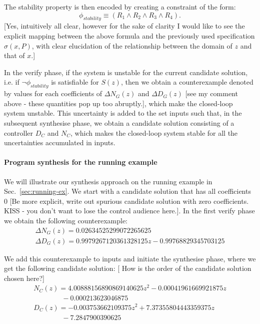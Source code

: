 \documentclass{sig-alternate-05-2015}
\newcommand{\red}[1]{{\color{red}#1}}
\begin{document}
The stability property is then encoded by creating a
constraint of the form:
$$
\phi_{stability} \equiv (R_1 \wedge R_2 \wedge R_3 \wedge R_4).
$$
\red{[Yes, intuitively all clear, however for the sake of clarity I would like to see the explicit mapping between the above formula and the previously used specification 
$\sigma(x, P)$, with clear elucidation of the relationship between the domain of $z$ and that of $x$.]}

In the {\sc verify} phase, if the system is unstable for the current candidate solution,
i.e. if $\neg \phi_{stability}$ is satisfiable for $S(z)$, 
then we obtain a counterexample denoted by 
values for each coefficients of $\Delta N_{G}(z)$ and $\Delta D_{G}(z)$ \red{[see my comment above - these quantities pop up too abruptly.]},
which make the closed-loop system unstable. This uncertainty is added to 
the set {\sc inputs} such that, in the subsequent {\sc synthesise} phase, 
we obtain a candidate solution consisting 
of a controller $D_C$ and $N_C$, which makes the closed-loop 
system stable for all the uncertainties accumulated in {\sc inputs}.

\paragraph{Program synthesis for the running example}
We will illustrate our synthesis approach on the running example 
in Sec.~\ref{sec:running-ex}.
We start with a candidate solution that has all coefficients 0 \red{[Be more explicit, write out spurious candidate solution with zero coefficients. KISS - you don't want to lose the control audience here.]}.
In the first {\sc verify} phase we obtain the following counterexample:
$$
\begin{array}{ll}
\Delta N_G(z) = 0.02634525299072265625\\
\Delta D_G(z) = 0.9979267120361328125z-0.99768829345703125
\end{array}
$$

We add this counterexample to {\sc inputs} and initiate the {\sc synthesise} phase, where we get the following candidate solution: 
\red{[ How is the order of the candidate solution chosen here?]}
$$
\begin{array}{ll}
N_C(z) {=} 4.00888156890869140625z^2{-}0.00041961669921875z\\
\qquad\qquad -0.000213623046875\\
D_C(z) {=} -0.003753662109375z^2{+}7.37355804443359375z \\
\qquad\qquad -7.2847900390625\\
\end{array}
$$
\end{document}
